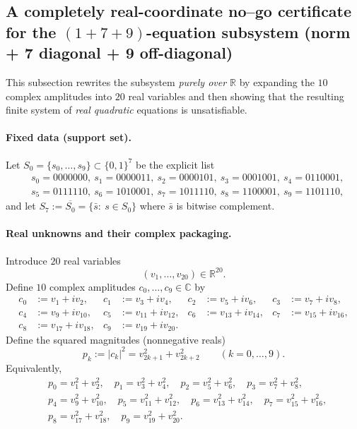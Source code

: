 \documentclass[11pt]{article}
\begin{document}
\subsection{A completely real-coordinate no--go certificate for the
\texorpdfstring{$(1+7+9)$}{(1+7+9)}-equation subsystem
(norm + 7 diagonal + 9 off-diagonal)}
\label{subsec:real-coordinate-nogo-1112226-subsystem}

This subsection rewrites the subsystem \emph{purely over $\mathbb R$} by expanding the
$10$ complex amplitudes into $20$ real variables and then showing that the resulting
finite system of \emph{real quadratic} equations is unsatisfiable.

\paragraph{Fixed data (support set).}
Let $S_0=\{s_0,\dots,s_9\}\subset\{0,1\}^7$ be the explicit list
\[
\begin{aligned}
&s_0=0000000,\ s_1=0000011,\ s_2=0000101,\ s_3=0001001,\ s_4=0110001,\\
&s_5=0111110,\ s_6=1010001,\ s_7=1011110,\ s_8=1100001,\ s_9=1101110,
\end{aligned}
\]
and let $S_7:=\overline{S_0}=\{\bar s:\ s\in S_0\}$ where $\bar s$ is bitwise complement.

\paragraph{Real unknowns and their complex packaging.}
Introduce $20$ real variables
\[
(v_1,\dots,v_{20})\in\mathbb R^{20}.
\]
Define $10$ complex amplitudes $c_0,\dots,c_9\in\mathbb C$ by
\begin{align}
c_0&:=v_1+i v_2, &
c_1&:=v_3+i v_4, &
c_2&:=v_5+i v_6, &
c_3&:=v_7+i v_8, \label{eq:real-coords-ck-1}\\
c_4&:=v_9+i v_{10}, &
c_5&:=v_{11}+i v_{12}, &
c_6&:=v_{13}+i v_{14}, &
c_7&:=v_{15}+i v_{16}, \label{eq:real-coords-ck-2}\\
c_8&:=v_{17}+i v_{18}, &
c_9&:=v_{19}+i v_{20}. &&
\label{eq:real-coords-ck-3}
\end{align}
Define the squared magnitudes (nonnegative reals)
\begin{equation}
p_k:=|c_k|^2=v_{2k+1}^2+v_{2k+2}^2\qquad (k=0,\dots,9).
\label{eq:real-coords-pk}
\end{equation}
Equivalently,
\[
\begin{aligned}
&p_0=v_1^2+v_2^2,\quad p_1=v_3^2+v_4^2,\quad p_2=v_5^2+v_6^2,\quad p_3=v_7^2+v_8^2,\\
&p_4=v_9^2+v_{10}^2,\quad p_5=v_{11}^2+v_{12}^2,\quad p_6=v_{13}^2+v_{14}^2,\quad p_7=v_{15}^2+v_{16}^2,\\
&p_8=v_{17}^2+v_{18}^2,\quad p_9=v_{19}^2+v_{20}^2.
\end{aligned}
\]
\end{document}
